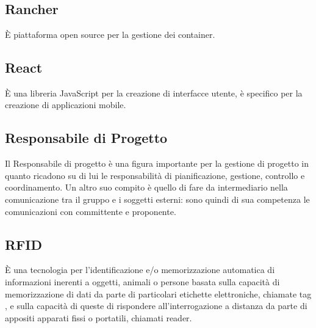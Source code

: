 \section{}

\subsection*{Rancher} È piattaforma open source per la gestione dei container.

\subsection*{React} È una libreria JavaScript per la creazione di interfacce utente, è specifico per la creazione di applicazioni mobile.

\subsection*{Responsabile di Progetto} Il Responsabile di progetto è una figura importante per la gestione di progetto in quanto ricadono su di lui le responsabilità di pianificazione, gestione, controllo e coordinamento. Un altro suo compito è quello di fare da intermediario nella comunicazione tra il gruppo e i soggetti esterni: sono quindi di sua competenza le comunicazioni con committente e proponente.

\subsection*{RFID} È una tecnologia per l'identificazione e/o memorizzazione automatica di informazioni inerenti a oggetti, animali o persone  basata sulla capacità di memorizzazione di dati da parte di particolari etichette elettroniche, chiamate tag , e sulla capacità di queste di rispondere all'interrogazione a distanza da parte di appositi apparati fissi o portatili, chiamati reader.
